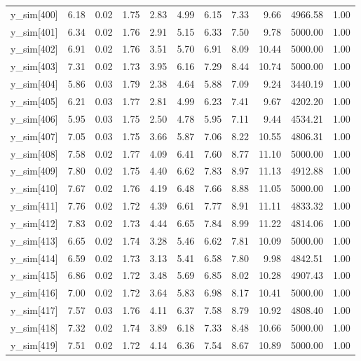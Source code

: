 \begin{table}[ht]
\begin{tabular}{rrrrrrrrrrr}
  y\_sim[400] & 6.18 & 0.02 & 1.75 & 2.83 & 4.99 & 6.15 & 7.33 & 9.66 & 4966.58 & 1.00 \\ 
  y\_sim[401] & 6.34 & 0.02 & 1.76 & 2.91 & 5.15 & 6.33 & 7.50 & 9.78 & 5000.00 & 1.00 \\ 
  y\_sim[402] & 6.91 & 0.02 & 1.76 & 3.51 & 5.70 & 6.91 & 8.09 & 10.44 & 5000.00 & 1.00 \\ 
  y\_sim[403] & 7.31 & 0.02 & 1.73 & 3.95 & 6.16 & 7.29 & 8.44 & 10.74 & 5000.00 & 1.00 \\ 
  y\_sim[404] & 5.86 & 0.03 & 1.79 & 2.38 & 4.64 & 5.88 & 7.09 & 9.24 & 3440.19 & 1.00 \\ 
  y\_sim[405] & 6.21 & 0.03 & 1.77 & 2.81 & 4.99 & 6.23 & 7.41 & 9.67 & 4202.20 & 1.00 \\ 
  y\_sim[406] & 5.95 & 0.03 & 1.75 & 2.50 & 4.78 & 5.95 & 7.11 & 9.44 & 4534.21 & 1.00 \\ 
  y\_sim[407] & 7.05 & 0.03 & 1.75 & 3.66 & 5.87 & 7.06 & 8.22 & 10.55 & 4806.31 & 1.00 \\ 
  y\_sim[408] & 7.58 & 0.02 & 1.77 & 4.09 & 6.41 & 7.60 & 8.77 & 11.10 & 5000.00 & 1.00 \\ 
  y\_sim[409] & 7.80 & 0.02 & 1.75 & 4.40 & 6.62 & 7.83 & 8.97 & 11.13 & 4912.88 & 1.00 \\ 
  y\_sim[410] & 7.67 & 0.02 & 1.76 & 4.19 & 6.48 & 7.66 & 8.88 & 11.05 & 5000.00 & 1.00 \\ 
  y\_sim[411] & 7.76 & 0.02 & 1.72 & 4.39 & 6.61 & 7.77 & 8.91 & 11.11 & 4833.32 & 1.00 \\ 
  y\_sim[412] & 7.83 & 0.02 & 1.73 & 4.44 & 6.65 & 7.84 & 8.99 & 11.22 & 4814.06 & 1.00 \\ 
  y\_sim[413] & 6.65 & 0.02 & 1.74 & 3.28 & 5.46 & 6.62 & 7.81 & 10.09 & 5000.00 & 1.00 \\ 
  y\_sim[414] & 6.59 & 0.02 & 1.73 & 3.13 & 5.41 & 6.58 & 7.80 & 9.98 & 4842.51 & 1.00 \\ 
  y\_sim[415] & 6.86 & 0.02 & 1.72 & 3.48 & 5.69 & 6.85 & 8.02 & 10.28 & 4907.43 & 1.00 \\ 
  y\_sim[416] & 7.00 & 0.02 & 1.72 & 3.64 & 5.83 & 6.98 & 8.17 & 10.41 & 5000.00 & 1.00 \\ 
  y\_sim[417] & 7.57 & 0.03 & 1.76 & 4.11 & 6.37 & 7.58 & 8.79 & 10.92 & 4808.40 & 1.00 \\ 
  y\_sim[418] & 7.32 & 0.02 & 1.74 & 3.89 & 6.18 & 7.33 & 8.48 & 10.66 & 5000.00 & 1.00 \\ 
  y\_sim[419] & 7.51 & 0.02 & 1.72 & 4.14 & 6.36 & 7.54 & 8.67 & 10.89 & 5000.00 & 1.00 \\ 

\end{tabular}
\end{table}
